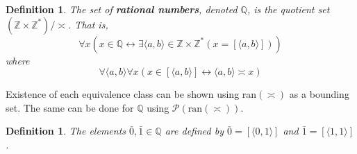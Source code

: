 \documentclass{report}
\newtheorem{definition}[theo]{Definition}
\begin{document}
\begin{definition}
The set of \textbf{rational numbers}, denoted $\mathbb Q$, is the quotient set $(\mathbb Z\times\mathbb Z^*)/\asymp$. That is,
\begin{equation*}
\forall x(x\in\mathbb Q\leftrightarrow\exists\langle a,b\rangle\in\mathbb Z\times\mathbb Z^*(x=[\langle a,b\rangle]))
\end{equation*}
where
\begin{equation*}
\forall\langle a,b\rangle\forall x(x\in[\langle a,b\rangle]\leftrightarrow \langle a,b\rangle\asymp x)
\end{equation*}
\end{definition}
\noindent Existence of each equivalence class can be shown using ran$(\asymp)$ as a bounding set. The 
same can be done for $\mathbb Q$ using $\mathscr P(\text{ran}(\asymp))$.
\begin{definition}
The elements $\bar0,\bar1\in\mathbb Q$ are defined by $\bar0=[\langle0,1\rangle]$ and 
$\bar1=[\langle 1,1\rangle]$.
\end{definition}
\newpage
\end{document}
